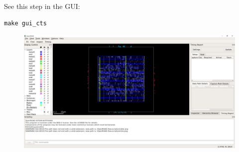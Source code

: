 \documentclass[a4paper,12pt,twoside]{article}
\begin{document}
See this step in the GUI:
\begin{verbatim}
make gui_cts
\end{verbatim}
\begin{figure}[H]
    \centering
    \includegraphics[width=\textwidth]{images/3.png}
\end{figure}
\end{document}
